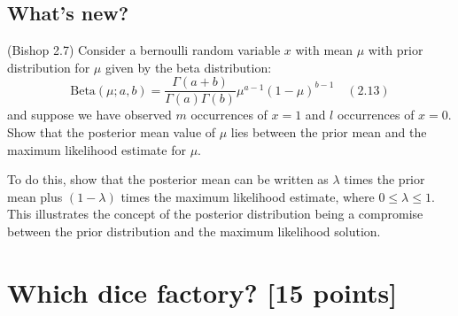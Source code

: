 \documentclass[11pt]{exam}
\begin{document}

\subsection{What's new?}

(Bishop 2.7) Consider a bernoulli random variable $x$ with mean $\mu$ 
with prior distribution for $\mu$ given by the beta distribution:
$$ \text{Beta}(\mu;a,b)=\frac{\Gamma(a+b)}{\Gamma(a)\Gamma(b)} \mu^{a-1}(1-\mu)^{b-1} \quad (2.13)$$
and suppose we have observed $m$ occurrences of $x=1$ and $l$
occurrences of $x=0$.  Show that the posterior mean value of $\mu$
lies between the prior mean and the maximum likelihood estimate for
$\mu$.

To do this, show that the posterior mean can be written as $\lambda$
times the prior mean plus $(1-\lambda)$ times the maximum likelihood
estimate, where $0 \le \lambda \le 1$. This illustrates the concept of
the posterior distribution being a compromise between the prior
distribution and the maximum likelihood solution.



\section{Which dice factory? [15 points]}
\end{document}

